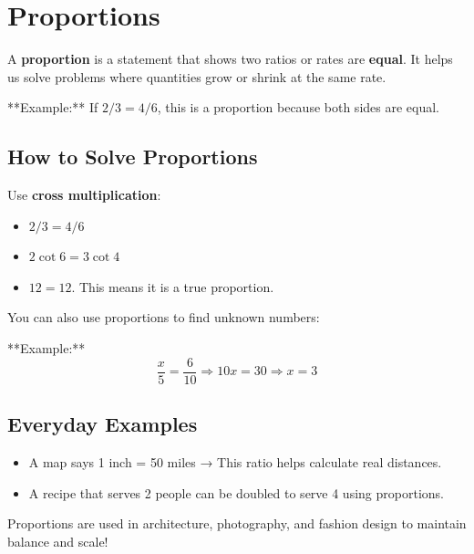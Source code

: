 \cleardoublepage
\section{Proportions}

A \textbf{proportion} is a statement that shows two ratios or rates are \textbf{equal}. It helps us solve problems where quantities grow or shrink at the same rate.

**Example:**  
If $2/3 = 4/6$, this is a proportion because both sides are equal.

\subsection*{How to Solve Proportions}

Use \textbf{cross multiplication}:
\begin{itemize}
  \item $2/3 = 4/6$ 
  \item $2 \cot 6 = 3 \cot 4$
  \item $12 = 12$. This means it is a true proportion.
\end{itemize}

You can also use proportions to find unknown numbers:

**Example:**
\[
\frac{x}{5} = \frac{6}{10} \Rightarrow 10x = 30 \Rightarrow x = 3
\]

\subsection*{Everyday Examples}

\begin{itemize}
  \item A map says 1 inch = 50 miles → This ratio helps calculate real distances.
  \item A recipe that serves 2 people can be doubled to serve 4 using proportions.
\end{itemize}

Proportions are used in architecture, photography, and fashion design to maintain balance and scale!





